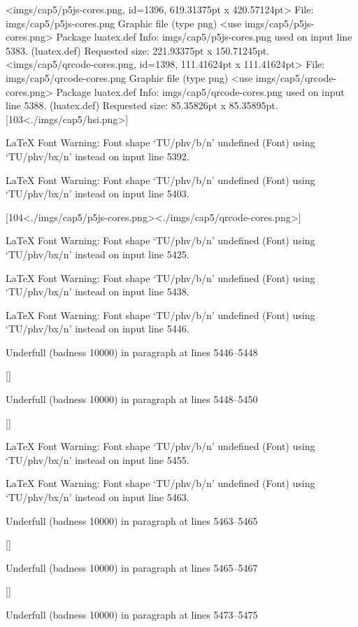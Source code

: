 <imgs/cap5/p5js-cores.png, id=1396, 619.31375pt x 420.57124pt>
File: imgs/cap5/p5js-cores.png Graphic file (type png)
<use imgs/cap5/p5js-cores.png>
Package luatex.def Info: imgs/cap5/p5js-cores.png  used on input line 5383.
(luatex.def)             Requested size: 221.93375pt x 150.71245pt.
<imgs/cap5/qrcode-cores.png, id=1398, 111.41624pt x 111.41624pt>
File: imgs/cap5/qrcode-cores.png Graphic file (type png)
<use imgs/cap5/qrcode-cores.png>
Package luatex.def Info: imgs/cap5/qrcode-cores.png  used on input line 5388.
(luatex.def)             Requested size: 85.35826pt x 85.35895pt.
[103<./imgs/cap5/hsi.png>]

LaTeX Font Warning: Font shape `TU/phv/b/n' undefined
(Font)              using `TU/phv/bx/n' instead on input line 5392.


LaTeX Font Warning: Font shape `TU/phv/b/n' undefined
(Font)              using `TU/phv/bx/n' instead on input line 5403.

[104<./imgs/cap5/p5js-cores.png><./imgs/cap5/qrcode-cores.png>]

LaTeX Font Warning: Font shape `TU/phv/b/n' undefined
(Font)              using `TU/phv/bx/n' instead on input line 5425.


LaTeX Font Warning: Font shape `TU/phv/b/n' undefined
(Font)              using `TU/phv/bx/n' instead on input line 5438.


LaTeX Font Warning: Font shape `TU/phv/b/n' undefined
(Font)              using `TU/phv/bx/n' instead on input line 5446.


Underfull \hbox (badness 10000) in paragraph at lines 5446--5448

 []


Underfull \hbox (badness 10000) in paragraph at lines 5448--5450

 []


LaTeX Font Warning: Font shape `TU/phv/b/n' undefined
(Font)              using `TU/phv/bx/n' instead on input line 5455.


LaTeX Font Warning: Font shape `TU/phv/b/n' undefined
(Font)              using `TU/phv/bx/n' instead on input line 5463.


Underfull \hbox (badness 10000) in paragraph at lines 5463--5465

 []


Underfull \hbox (badness 10000) in paragraph at lines 5465--5467

 []


Underfull \hbox (badness 10000) in paragraph at lines 5473--5475


